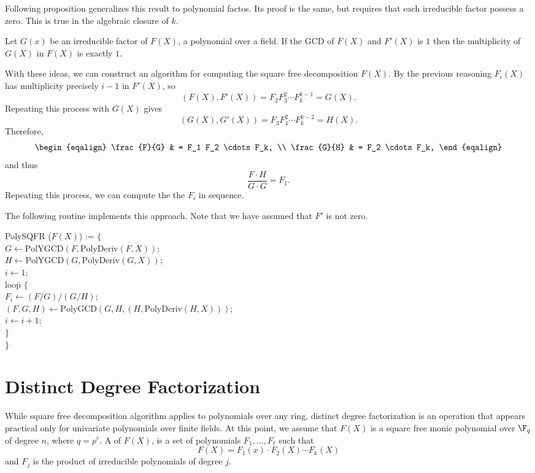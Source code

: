 Following proposition generalizes this result to polynomial factos.
Its proof is the same, but requires that each irreducible factor
possess a zero.  This is true in the algebraic closure of $k$.

\begin{proposition}
Let $G(x)$ be an irreducible factor of $F(X)$, a polynomial over a
field.  If the GCD of $F(X)$ and $F'(X)$ is $1$ then the multiplicity
of $G(X)$ in $F(X)$ is exactly $1$.
\end{proposition}

\medskip
With these ideas, we can construct an algorithm for computing the
square free decomposition $F(X)$.  By the previous reasoning $F_i(X)$
has multiplicity precisely $i-1$ in $F'(X)$, so
\[
(F(X), F'(X)) = F_2 F_3^2 \cdots F_k^{k-1} = G(X).
\]
Repeating this process with $G(X)$ gives
\[
(G(X), G'(X)) = F_3 F_4^2 \cdots F_k^{k-2} = H(X).
\]
Therefore,
\[
\begin{eqalign}
\frac{F}{G} & = F_1 F_2 \cdots F_k, \\
\frac{G}{H} & = F_2 \cdots F_k,
\end{eqalign}
\]
and thus
\[
\frac{F \cdot H}{G \cdot G} = F_1.
\]
Repeating this process, we can compute the the $F_i$ in sequence.

The following routine implements this approach.  Note that we have
assumed that $F'$ is not zero.

\begindsacode
PolySQFR ($F(X)$) := $\{$ \\
\> $G \leftarrow \mbox{PolYGCD}(F, \mbox{PolyDeriv}(F, X))$;\\
\> $H \leftarrow \mbox{PolYGCD}(G, \mbox{PolyDeriv}(G, X))$;\\
\> $i \leftarrow 1$;\\
\> loo\=p $\{$\\
\> \> $F_i \leftarrow (F/G)/(G/H)$; \\
\> \> $(F, G, H) \leftarrow \mbox{PolyGCD}(G, H, (H, \mbox{PolyDeriv}(H, X)))$;\\
\>\> $i \leftarrow i + 1$; \\
\>\> $\}$\\
\> $\}$
\enddsacode

\section{Distinct Degree Factorization}
\label{FFac:Distinct:Sec}

While square free decomposition algorithm applies to polynomials over
any ring, distinct degree factorization is an operation that appears
practical only for univariate polynomials over finite fields.  At this
point, we assume that $F(X)$ is a square free monic polynomial over
$\F_q$ of degree $n$, where $q= p^r$.  A  of $F(X)$, is a set of polynomials $F_1, \ldots,
F_{\ell}$ such that
\[
F(X) = F_1(x) \cdot F_2(X) \cdots F_k(X)
\]
and $F_j$ is the product of irreducible polynomials of degree $j$.

